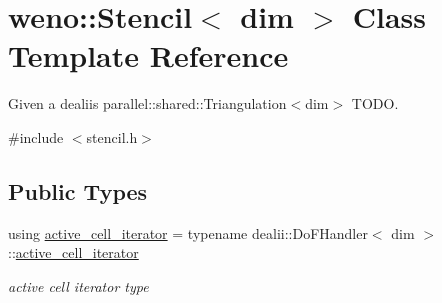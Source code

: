 \hypertarget{classweno_1_1_stencil}{}\section{weno\+:\+:Stencil$<$ dim $>$ Class Template Reference}
\label{classweno_1_1_stencil}


Given a dealii\textquotesingle{}s parallel\+::shared\+::\+Triangulation$<$dim$>$ T\+O\+DO.  




{\ttfamily \#include $<$stencil.\+h$>$}

\subsection*{Public Types}
\begin{DoxyCompactItemize}
\item 
using \hyperlink{classweno_1_1_stencil_a5a730ad61bd5e9c36a86ccb36578f42c}{active\+\_\+cell\+\_\+iterator} = typename dealii\+::\+Do\+F\+Handler$<$ dim $>$\+::\hyperlink{classweno_1_1_stencil_a5a730ad61bd5e9c36a86ccb36578f42c}{active\+\_\+cell\+\_\+iterator}
\begin{DoxyCompactList}\small\item\em active cell iterator type \end{DoxyCompactList}\end{DoxyCompactItemize}
